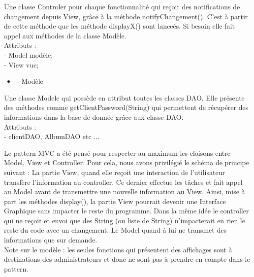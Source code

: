 \documentclass{article}
\begin{document}
\begin{flushleft}
Une classe Controler pour chaque fonctionnalité qui reçoit des notifications
de changement depuis View, grâce à la méthode notifyChangement(). C'est à
partir de cette méthode que les méthode displayX() sont lanceés. Si besoin
elle fait appel aux méthodes de la classe Modèle.\\
Attributs :\\

- Model modèle;\\
- View vue;\\

\vspace{1\baselineskip}
\begin{itemize}
  \item -- Modèle --
\end{itemize}

Une classe Modele qui possède en attribut toutes les classes DAO. Elle
présente des méthodes comme getClientPassword(String) qui permettent de
récupérer des informations dans la base de donnée grâce aux classe DAO.\\
Attributs :\\
- clientDAO, AlbumDAO etc ...
\vspace{1\baselineskip}

Le pattern MVC a été pensé pour respecter au maximum les cloisons entre Model,
View et Controller. Pour cela, nous avons privilégié le schéma de principe
suivant : La partie View, quand elle reçoit une interaction de l’utilisateur
transfère l’information au controller. Ce dernier effectue les tâches et fait
appel au Model avant de transmettre une nouvelle information au View.
Ainsi, mise à part les méthodes display(), la partie View pourrait devenir une
Interface Graphique sans impacter le reste du programme. Dans la même idée le
controller qui ne reçoit et envoi que des String (ou liste de String)
n’impacterait en rien le reste du code avec un changement. Le Model quand
à lui ne transmet des informations que sur demande.\\
\vspace{1\baselineskip}
Note sur le modèle : les seules fonctions qui présentent des affichages
sont à destinations des administrateurs et donc ne sont pas à prendre en
compte dans le pattern.


\end{flushleft}
\end{document}
